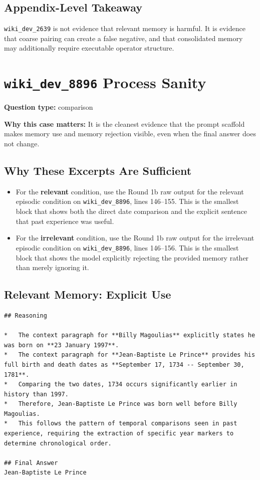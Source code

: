 \subsection{Appendix-Level Takeaway}

\texttt{wiki\_dev\_2639} is not evidence that relevant memory is harmful. It is evidence that coarse pairing can create a false negative, and that consolidated memory may additionally require executable operator structure.

\section{\texttt{wiki\_dev\_8896} Process Sanity}
\label{app:wiki-dev-8896}

\textbf{Question type:} comparison

\textbf{Why this case matters:} It is the cleanest evidence that the prompt scaffold makes memory use and memory rejection visible, even when the final answer does not change.

\subsection{Why These Excerpts Are Sufficient}

\begin{itemize}
\item For the \textbf{relevant} condition, use the Round 1b raw output for the relevant episodic condition on \texttt{wiki\_dev\_8896}, lines 146--155. This is the smallest block that shows both the direct date comparison and the explicit sentence that past experience was useful.
\item For the \textbf{irrelevant} condition, use the Round 1b raw output for the irrelevant episodic condition on \texttt{wiki\_dev\_8896}, lines 146--156. This is the smallest block that shows the model explicitly rejecting the provided memory rather than merely ignoring it.
\end{itemize}

\subsection{Relevant Memory: Explicit Use}

\begin{lstlisting}
## Reasoning

*   The context paragraph for **Billy Magoulias** explicitly states he was born on **23 January 1997**.
*   The context paragraph for **Jean-Baptiste Le Prince** provides his full birth and death dates as **September 17, 1734 -- September 30, 1781**.
*   Comparing the two dates, 1734 occurs significantly earlier in history than 1997.
*   Therefore, Jean-Baptiste Le Prince was born well before Billy Magoulias.
*   This follows the pattern of temporal comparisons seen in past experience, requiring the extraction of specific year markers to determine chronological order.

## Final Answer
Jean-Baptiste Le Prince
\end{lstlisting}

